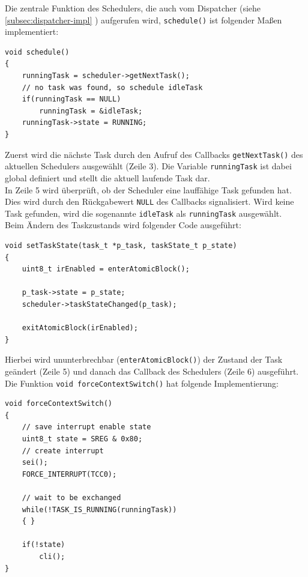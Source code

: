 \documentclass[fontsize=12pt, toc=bibliography, notitlepage]{scrreprt}
\newcommand{\refnn}[1]{\ref{#1} \nameref{#1}}
\begin{document}
Die zentrale Funktion des Schedulers, die auch vom Dispatcher (siehe \refnn{subsec:dispatcher-impl}) aufgerufen wird, \lstinline$schedule()$ ist folgender Maßen implementiert:

\begin{lstlisting}[title=scheduler.c]
void schedule()
{
	runningTask = scheduler->getNextTask();
	// no task was found, so schedule idleTask
	if(runningTask == NULL)
		runningTask = &idleTask;
	runningTask->state = RUNNING;
}
\end{lstlisting}

Zuerst wird die nächste Task durch den Aufruf des Callbacks \lstinline$getNextTask()$ des aktuellen Schedulers ausgewählt (Zeile 3). Die Variable \lstinline$runningTask$ ist dabei global definiert und stellt die aktuell laufende Task dar.\\

In Zeile 5 wird überprüft, ob der Scheduler eine lauffähige Task gefunden hat. Dies wird durch den Rückgabewert \lstinline$NULL$ des Callbacks signalisiert. Wird keine Task gefunden, wird die sogenannte \lstinline$idleTask$ als \lstinline$runningTask$ ausgewählt.\\

Beim Ändern des Taskzustands wird folgender Code ausgeführt:

\begin{lstlisting}[title=scheduler.c]
void setTaskState(task_t *p_task, taskState_t p_state)
{
	uint8_t irEnabled = enterAtomicBlock();
	
	p_task->state = p_state;
	scheduler->taskStateChanged(p_task);
		
	exitAtomicBlock(irEnabled);	
}
\end{lstlisting}

Hierbei wird ununterbrechbar (\lstinline$enterAtomicBlock()$) der Zustand der Task geändert (Zeile 5) und danach das Callback des Schedulers (Zeile 6) ausgeführt.\\

Die Funktion \lstinline$void forceContextSwitch()$ hat folgende Implementierung:

\begin{lstlisting}[title=scheduler.c]
void forceContextSwitch()
{
	// save interrupt enable state
	uint8_t state = SREG & 0x80;
	// create interrupt
	sei();
	FORCE_INTERRUPT(TCC0);
	
	// wait to be exchanged
	while(!TASK_IS_RUNNING(runningTask))
	{ }
	
	if(!state)
		cli();
}
\end{lstlisting}
\end{document}
